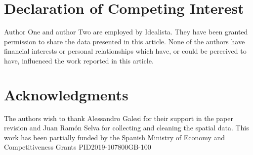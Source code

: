 \documentclass[Royal,times,]{sagej}
\begin{document}
\hypertarget{declaration-of-competing-interest}{%
\section{Declaration of Competing
Interest}\label{declaration-of-competing-interest}}

Author One and author Two are employed by Idealista. They have been
granted permission to share the data presented in this article. None of
the authors have financial interests or personal relationships which
have, or could be perceived to have, influenced the work reported in
this article.

\hypertarget{acknowledgments}{%
\section{Acknowledgments}\label{acknowledgments}}

The authors wish to thank Alessandro Galesi for their support in the
paper revision and Juan Ramón Selva for collecting and cleaning the
spatial data. This work has been partially funded by the Spanish
Ministry of Economy and Competitiveness Grants PID2019-107800GB-100
\end{document}
